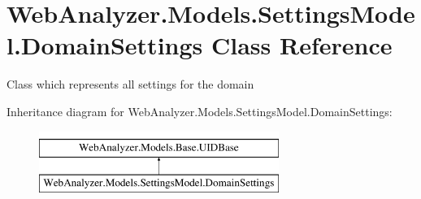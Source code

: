 \hypertarget{class_web_analyzer_1_1_models_1_1_settings_model_1_1_domain_settings}{}\section{Web\+Analyzer.\+Models.\+Settings\+Model.\+Domain\+Settings Class Reference}
\label{class_web_analyzer_1_1_models_1_1_settings_model_1_1_domain_settings}


Class which represents all settings for the domain  


Inheritance diagram for Web\+Analyzer.\+Models.\+Settings\+Model.\+Domain\+Settings\+:\begin{figure}[H]
\begin{center}
\leavevmode
\includegraphics[height=2.000000cm]{class_web_analyzer_1_1_models_1_1_settings_model_1_1_domain_settings}
\end{center}
\end{figure}
